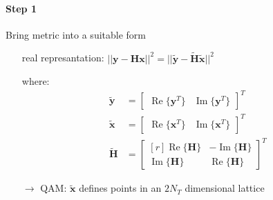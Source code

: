 \documentclass[a4paper, 10pt]{article}
\begin{document}
\paragraph{Step 1}
Bring metric into a suitable form
\begin{itemize}
	\item[] real represantation: $||\mathbf{y} - \mathbf{Hx}||^2 = ||\tilde{\mathbf{y}} - \tilde{\mathbf{H}}\tilde{\mathbf{x}}||^2 $
	\item[] where:
	\begin{align*}
		\tilde{\mathbf{y}} &= \begin{bmatrix*} \operatorname{Re}\{\mathbf{y}^T\} & \operatorname{Im}\{\mathbf{y}^T \}	\end{bmatrix*}^T \\
		\tilde{\mathbf{x}} &= \begin{bmatrix*} \operatorname{Re}\{\mathbf{x}^T\} & \operatorname{Im}\{\mathbf{x}^T \}	\end{bmatrix*}^T \\
		\tilde{\mathbf{H}} &= \begin{bmatrix*}[r] \operatorname{Re}\{\mathbf{H}\} & -\operatorname{Im}\{\mathbf{H} \} \\ \operatorname{Im}\{ \mathbf{H}\} &\operatorname{Re}\{\mathbf{H} \}\end{bmatrix*}^T 		
	\end{align*}
	\item[$\rightarrow$] QAM: $\tilde{\mathbf{x}}$ defines points in an $ 2N_T $ dimensional lattice
\end{itemize}
\end{document}
